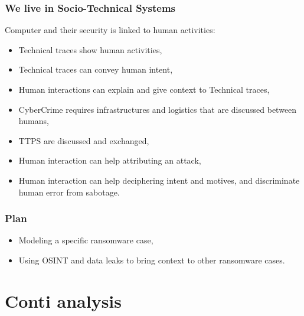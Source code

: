 \begin{frame}
    \frametitle{We live in Socio-Technical Systems}
    Computer and their security is linked to human activities:

    \begin{itemize}
        \item Technical traces show human activities,
        \item Technical traces can convey human intent,
        \item Human interactions can explain and give context to Technical traces,
        \item CyberCrime requires infrastructures and logistics that are discussed between humans,
        \item TTPS are discussed and exchanged,
        \item Human interaction can help attributing an attack,
        \item Human interaction can help deciphering intent and motives, and discriminate human error from sabotage.
    \end{itemize}
\end{frame}


\begin{frame}
    \frametitle{Plan}
    \begin{itemize}
        \item Modeling a specific ransomware case,
        \item Using OSINT and data leaks to bring context to other ransomware cases.
    \end{itemize}

\end{frame}

\section{Conti analysis}


